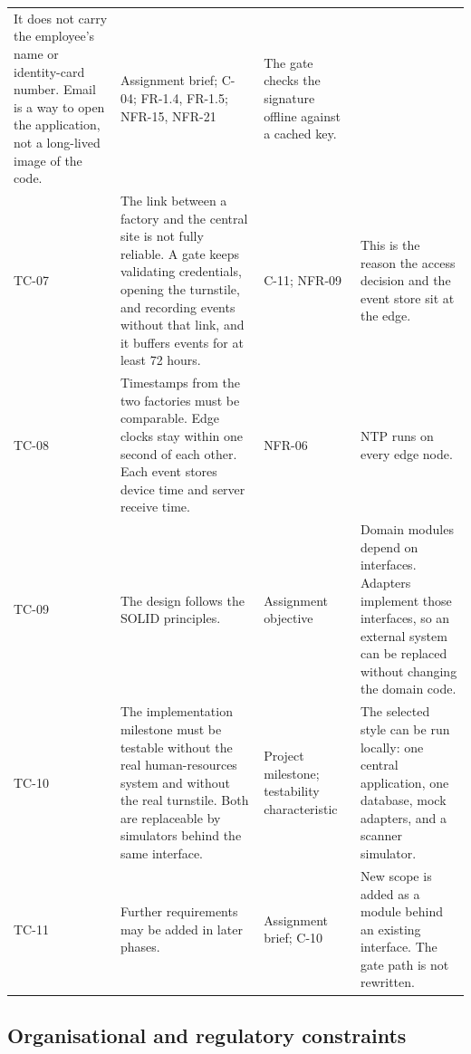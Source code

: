 \begin{longtable}{@{}L{1.25cm}L{5.15cm}L{4.05cm}L{4.15cm}@{}}
It does not carry the employee's name or identity-card number.
Email is a way to open the application, not a long-lived image of the code. &
Assignment brief; C-04; FR-1.4, FR-1.5; NFR-15, NFR-21 &
The gate checks the signature offline against a cached key.\\
\addlinespace
TC-07 &
The link between a factory and the central site is not fully reliable.
A gate keeps validating credentials, opening the turnstile, and recording events without that link, and it buffers events for at least 72 hours. &
C-11; NFR-09 &
This is the reason the access decision and the event store sit at the edge.\\
\addlinespace
TC-08 &
Timestamps from the two factories must be comparable.
Edge clocks stay within one second of each other.
Each event stores device time and server receive time. &
NFR-06 &
NTP runs on every edge node.\\
\addlinespace
TC-09 &
The design follows the SOLID principles. &
Assignment objective &
Domain modules depend on interfaces.
Adapters implement those interfaces, so an external system can be replaced without changing the domain code.\\
\addlinespace
TC-10 &
The implementation milestone must be testable without the real human-resources system and without the real turnstile.
Both are replaceable by simulators behind the same interface. &
Project milestone; testability characteristic &
The selected style can be run locally: one central application, one database, mock adapters, and a scanner simulator.\\
\addlinespace
TC-11 &
Further requirements may be added in later phases. &
Assignment brief; C-10 &
New scope is added as a module behind an existing interface.
The gate path is not rewritten.\\
\bottomrule
\end{longtable}

\subsection{Organisational and regulatory constraints}

